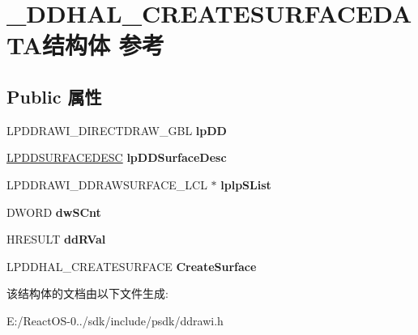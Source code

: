 \hypertarget{struct___d_d_h_a_l___c_r_e_a_t_e_s_u_r_f_a_c_e_d_a_t_a}{}\section{\+\_\+\+D\+D\+H\+A\+L\+\_\+\+C\+R\+E\+A\+T\+E\+S\+U\+R\+F\+A\+C\+E\+D\+A\+T\+A结构体 参考}
\label{struct___d_d_h_a_l___c_r_e_a_t_e_s_u_r_f_a_c_e_d_a_t_a}
\subsection*{Public 属性}
\begin{DoxyCompactItemize}
\item 
\mbox{\label{struct___d_d_h_a_l___c_r_e_a_t_e_s_u_r_f_a_c_e_d_a_t_a_a9fc833ddc3dd5836042988b08c97c8fe}} 
L\+P\+D\+D\+R\+A\+W\+I\+\_\+\+D\+I\+R\+E\+C\+T\+D\+R\+A\+W\+\_\+\+G\+BL {\bfseries lp\+DD}
\item 
\mbox{\label{struct___d_d_h_a_l___c_r_e_a_t_e_s_u_r_f_a_c_e_d_a_t_a_a1a1a1466af0850cdec771594faf387b9}} 
\hyperlink{interfacevoid}{L\+P\+D\+D\+S\+U\+R\+F\+A\+C\+E\+D\+E\+SC} {\bfseries lp\+D\+D\+Surface\+Desc}
\item 
\mbox{\label{struct___d_d_h_a_l___c_r_e_a_t_e_s_u_r_f_a_c_e_d_a_t_a_aa2e6b042d9f880ade64507ffd6be0420}} 
L\+P\+D\+D\+R\+A\+W\+I\+\_\+\+D\+D\+R\+A\+W\+S\+U\+R\+F\+A\+C\+E\+\_\+\+L\+CL $\ast$ {\bfseries lplp\+S\+List}
\item 
\mbox{\label{struct___d_d_h_a_l___c_r_e_a_t_e_s_u_r_f_a_c_e_d_a_t_a_a3700e27a40fb558a8cadc1ac309e5fcf}} 
D\+W\+O\+RD {\bfseries dw\+S\+Cnt}
\item 
\mbox{\label{struct___d_d_h_a_l___c_r_e_a_t_e_s_u_r_f_a_c_e_d_a_t_a_a9a81af355cd2ce64025d5c103f034219}} 
H\+R\+E\+S\+U\+LT {\bfseries dd\+R\+Val}
\item 
\mbox{\label{struct___d_d_h_a_l___c_r_e_a_t_e_s_u_r_f_a_c_e_d_a_t_a_adadaa9b03c5af4fc8bb7b4af9d173362}} 
L\+P\+D\+D\+H\+A\+L\+\_\+\+C\+R\+E\+A\+T\+E\+S\+U\+R\+F\+A\+CE {\bfseries Create\+Surface}
\end{DoxyCompactItemize}


该结构体的文档由以下文件生成\+:\begin{DoxyCompactItemize}
\item 
E\+:/\+React\+O\+S-\/0../sdk/include/psdk/ddrawi.\+h\end{DoxyCompactItemize}
